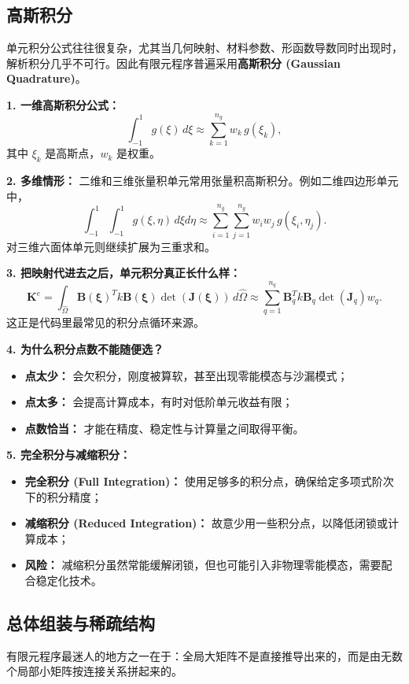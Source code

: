 \documentclass[11pt, a4paper, UTF8]{ctexart}
\begin{document}
\subsection{高斯积分}
单元积分公式往往很复杂，尤其当几何映射、材料参数、形函数导数同时出现时，解析积分几乎不可行。因此有限元程序普遍采用\textbf{高斯积分 (Gaussian Quadrature)}。

\textbf{1. 一维高斯积分公式：}
\[
\int_{-1}^{1} g(\xi)\, d\xi \approx \sum_{k=1}^{n_g} w_k\, g(\xi_k),
\]
其中 $\xi_k$ 是高斯点，$w_k$ 是权重。

\textbf{2. 多维情形：}
二维和三维张量积单元常用张量积高斯积分。例如二维四边形单元中，
\[
\int_{-1}^{1}\int_{-1}^{1} g(\xi,\eta)\, d\xi d\eta
\approx
\sum_{i=1}^{n_g}\sum_{j=1}^{n_g} w_i w_j\, g(\xi_i,\eta_j).
\]
对三维六面体单元则继续扩展为三重求和。

\textbf{3. 把映射代进去之后，单元积分真正长什么样：}
\[
\bm{K}^e
=
\int_{\hat{\Omega}}
\bm{B}(\bm{\xi})^T
k
\bm{B}(\bm{\xi})
\det(\bm{J}(\bm{\xi}))
\,
d\hat{\Omega}
\approx
\sum_{q=1}^{n_q}
\bm{B}_q^T k \bm{B}_q \det(\bm{J}_q) w_q.
\]
这正是代码里最常见的积分点循环来源。

\textbf{4. 为什么积分点数不能随便选？}
\begin{itemize}
    \item \textbf{点太少：} 会欠积分，刚度被算软，甚至出现零能模态与沙漏模式；
    \item \textbf{点太多：} 会提高计算成本，有时对低阶单元收益有限；
    \item \textbf{点数恰当：} 才能在精度、稳定性与计算量之间取得平衡。
\end{itemize}

\textbf{5. 完全积分与减缩积分：}
\begin{itemize}
    \item \textbf{完全积分 (Full Integration)：} 使用足够多的积分点，确保给定多项式阶次下的积分精度；
    \item \textbf{减缩积分 (Reduced Integration)：} 故意少用一些积分点，以降低闭锁或计算成本；
    \item \textbf{风险：} 减缩积分虽然常能缓解闭锁，但也可能引入非物理零能模态，需要配合稳定化技术。
\end{itemize}

\subsection{总体组装与稀疏结构}
有限元程序最迷人的地方之一在于：全局大矩阵不是直接推导出来的，而是由无数个局部小矩阵按连接关系拼起来的。
\end{document}
